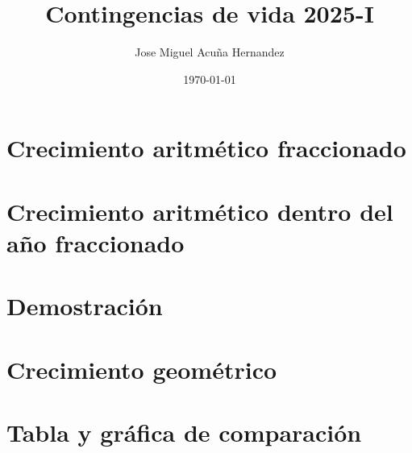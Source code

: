 \documentclass{article}
\title{Contingencias de vida 2025-I}
\author{Jose Miguel Acuña Hernandez}
\date{\today}
\begin{document}
\thispagestyle{firstpage}
\vspace*{9\baselineskip}

\renewcommand{\contentsname}{}
\begin{cuadrocontenido}
  \tableofcontents
\end{cuadrocontenido}

\section{Crecimiento aritmético fraccionado}


\section{Crecimiento aritmético dentro del año fraccionado}


\section{Demostración}


\section{Crecimiento geométrico}

    
\section{Tabla y gráfica de comparación}

\end{document}
